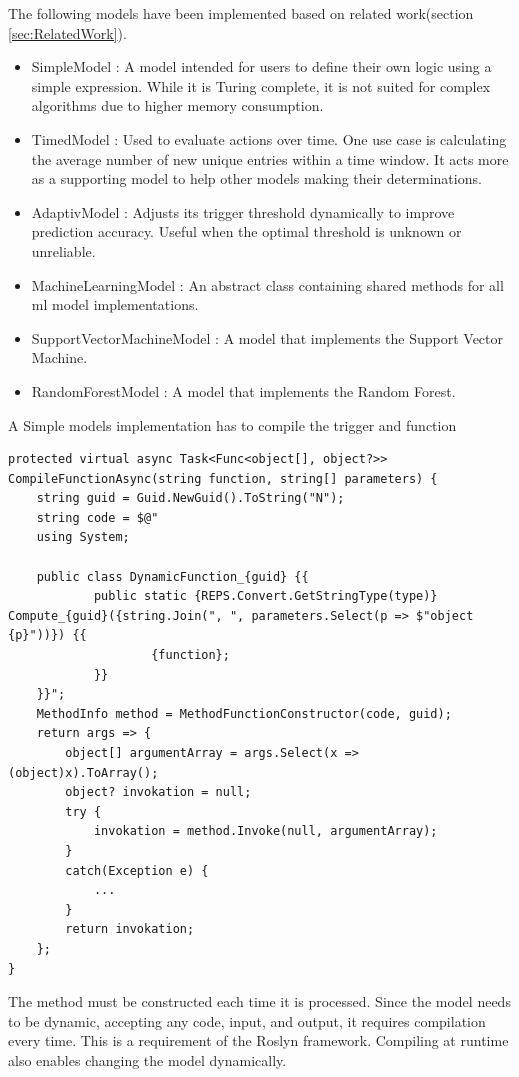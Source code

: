 		The following models have been implemented based on related work(section \ref{sec:RelatedWork}).
	
	\begin{itemize}
		\item SimpleModel : A model intended for users to define their own logic using a simple expression. While it is Turing complete, it is not suited for complex algorithms due to higher memory consumption.
		\item TimedModel : Used to evaluate actions over time. One use case is calculating the average number of new unique entries within a time window. It acts more as a supporting model to help other models making their determinations.
		\item AdaptivModel : Adjusts its trigger threshold dynamically to improve prediction accuracy. Useful when the optimal threshold is unknown or unreliable.
		\item MachineLearningModel : An abstract class containing shared methods for all \gls{ml} model implementations.
		\item SupportVectorMachineModel : A model that implements the Support Vector Machine.
		\item RandomForestModel :  A model that implements the Random Forest.
	\end{itemize}
	\noindent
	\newpage
	A Simple models implementation has to compile the trigger and function
	\begin{lstlisting}[language={[sharp]C}, caption={SimpleMode.cs},label=lst:simpleCompile]
protected virtual async Task<Func<object[], object?>> CompileFunctionAsync(string function, string[] parameters) {
	string guid = Guid.NewGuid().ToString("N");
	string code = $@"
	using System;
	
	public class DynamicFunction_{guid} {{
			public static {REPS.Convert.GetStringType(type)} Compute_{guid}({string.Join(", ", parameters.Select(p => $"object {p}"))}) {{
					{function};
			}}
	}}";
	MethodInfo method = MethodFunctionConstructor(code, guid);
	return args => {
		object[] argumentArray = args.Select(x => (object)x).ToArray();
		object? invokation = null;
		try {
			invokation = method.Invoke(null, argumentArray);
		}
		catch(Exception e) {
			...
		}
		return invokation;
	};
}
	\end{lstlisting}
	The method must be constructed each time it is processed. Since the model needs to be dynamic, accepting any code, input, and output, it requires compilation every time. This is a requirement of the Roslyn framework. Compiling at runtime also enables changing the model dynamically.
	
